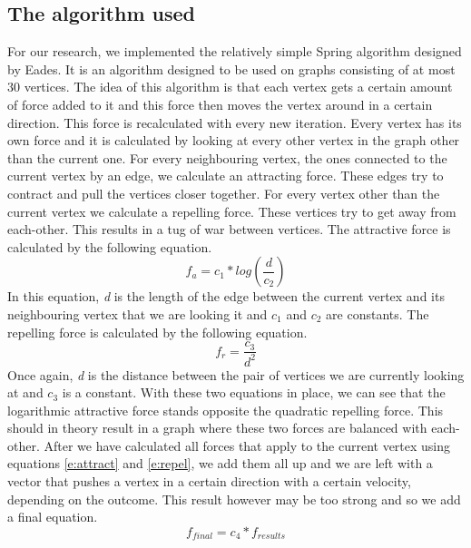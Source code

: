 \documentclass[a4paper,12pt,twoside]{article}
\begin{document}
\subsection{The algorithm used}\label{s:algorithm}
For our research, we implemented the relatively simple Spring algorithm designed by Eades\cite{Eades}. It is an algorithm designed to be used on graphs consisting of at most 30 vertices. The idea of this algorithm is that each vertex gets a certain amount of force added to it and this force then moves the vertex around in a certain direction. This force is recalculated with every new iteration. Every vertex has its own force and it is calculated by looking at every other vertex in the graph other than the current one. For every neighbouring vertex, the ones connected to the current vertex by an edge, we calculate an attracting force. These edges try to contract and pull the vertices closer together. For every vertex other than the current vertex we calculate a repelling force. These vertices try to get away from each-other. This results in a tug of war between vertices. 
\newline
The attractive force is calculated by the following equation.
\begin{equation}\label{e:attract}
f_a = c_1*log(\frac{d}{c_2})
\end{equation}
In this equation, \emph{d} is the length of the edge between the current vertex and its neighbouring vertex that we are looking it and \emph{$c_1$} and \emph{$c_2$} are constants.
\newline
The repelling force is calculated by the following equation.
\begin{equation}\label{e:repel}
f_r = \frac{c_3}{d^2}
\end{equation}
Once again, \emph{d} is the distance between the pair of vertices we are currently looking at and \emph{$c_3$} is a constant. With these two equations in place, we can see that the logarithmic attractive force stands opposite the quadratic repelling force. This should in theory result in a graph where these two forces are balanced with each-other.
\newline
After we have calculated all forces that apply to the current vertex using equations \ref{e:attract} and \ref{e:repel}, we add them all up and we are left with a vector that pushes a vertex in a certain direction with a certain velocity, depending on the outcome. This result however may be too strong and so we add a final equation.
\begin{equation}\label{e:damper}
f_{final} = c_4 * f_{results}
\end{equation}
\end{document}
